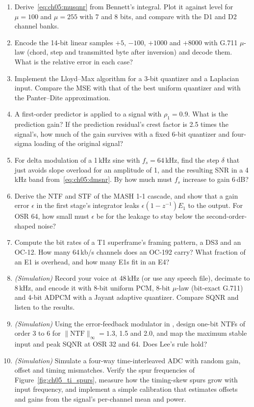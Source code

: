 \begin{enumerate}[label=\thechapter.\arabic*]
error independent of a constant input, and that its variance is $\Delta^2/4$. Why does RPDF dither
fail for the second moment?
\item Derive~\eqref{eq:ch05:musqnr} from Bennett's integral. Plot it against level for $\mu=100$
and $\mu=255$ with 7 and 8 bits, and compare with the D1 and D2 channel banks.
\item Encode the 14-bit linear samples $+5$, $-100$, $+1000$ and $+8000$ with G.711 $\mu$-law
(chord, step and transmitted byte after inversion) and decode them. What is the relative error in
each case?
\item Implement the Lloyd--Max algorithm for a 3-bit quantizer and a Laplacian input. Compare the
MSE with that of the best uniform quantizer and with the Panter--Dite approximation.
\item A first-order predictor is applied to a signal with $\rho_1=0.9$. What is the prediction gain?
If the prediction residual's crest factor is 2.5 times the signal's, how much of the gain survives
with a fixed 6-bit quantizer and four-sigma loading of the original signal?
\item For delta modulation of a 1\,kHz sine with $f_s=64$\,kHz, find the step $\delta$ that just
avoids slope overload for an amplitude of 1, and the resulting SNR in a 4\,kHz band
from~\eqref{eq:ch05:dmsnr}. By how much must $f_s$ increase to gain 6\,dB?
\item Derive the NTF and STF of the MASH 1-1 cascade, and show that a gain error $\epsilon$ in the
first stage's integrator leaks $\epsilon(1-z^{-1})E_1$ to the output. For OSR 64, how small must
$\epsilon$ be for the leakage to stay below the second-order-shaped noise?
\item Compute the bit rates of a T1 superframe's framing pattern, a DS3 and an OC-12. How many
64\,kb/s channels does an OC-192 carry? What fraction of an E1 is overhead, and how many E1s
fit in an E4?
\item \emph{(Simulation)} Record your voice at 48\,kHz (or use any speech file), decimate to
8\,kHz, and encode it with 8-bit uniform PCM, 8-bit $\mu$-law (bit-exact G.711) and 4-bit ADPCM
with a Jayant adaptive quantizer. Compare SQNR and listen to the results.
\item \emph{(Simulation)} Using the error-feedback modulator in , design
one-bit NTFs of order 3 to 6 for $\|\mathrm{NTF}\|_\infty=1.3$, 1.5 and 2.0, and map the maximum
stable input and peak SQNR at OSR 32 and 64. Does Lee's rule hold?
\item \emph{(Simulation)} Simulate a four-way time-interleaved ADC with random gain, offset and
timing mismatches. Verify the spur frequencies of Figure~\ref{fig:ch05_ti_spurs}, measure how the
timing-skew spurs grow with input frequency, and implement a simple calibration that estimates
offsets and gains from the signal's per-channel mean and power.
\end{enumerate}

